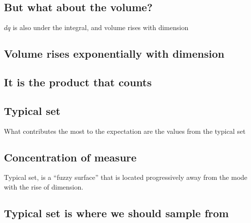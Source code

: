 \documentclass[letterpaper,10pt,english]{jupyterBook}
\begin{document}
\subsection{But what about the volume?}
\label{\detokenize{Lecture 3:but-what-about-the-volume}}
\sphinxAtStartPar
\(dq\) is also under the integral, and volume rises with dimension







\subsection{Volume rises exponentially with dimension}
\label{\detokenize{Lecture 3:volume-rises-exponentially-with-dimension}}





\subsection{It is the product that counts}
\label{\detokenize{Lecture 3:it-is-the-product-that-counts}}





\subsection{Typical set}
\label{\detokenize{Lecture 3:typical-set}}
\sphinxAtStartPar
What contributes the most to the expectation are the values from the typical set






\subsection{Concentration of measure}
\label{\detokenize{Lecture 3:concentration-of-measure}}
\sphinxAtStartPar
Typical set, is a “fuzzy surface” that is located progressively away from the mode with the rise of dimension.






\subsection{Typical set is where we should sample from}
\label{\detokenize{Lecture 3:typical-set-is-where-we-should-sample-from}}
\end{document}
